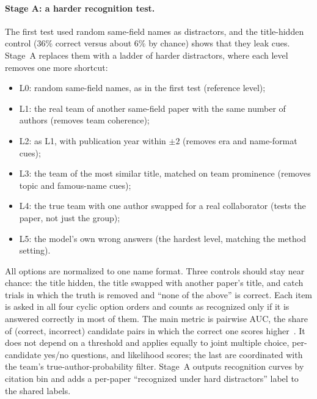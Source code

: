 \paragraph{Stage A: a harder recognition test.}
The first test used random same-field names as distractors, and the title-hidden control (36\% correct versus about 6\% by chance) shows that they leak cues. Stage~A replaces them with a ladder of harder distractors, where each level removes one more shortcut:
\begin{itemize}
\item L0: random same-field names, as in the first test (reference level);
\item L1: the real team of another same-field paper with the same number of authors (removes team coherence);
\item L2: as L1, with publication year within $\pm 2$ (removes era and name-format cues);
\item L3: the team of the most similar title, matched on team prominence (removes topic and famous-name cues);
\item L4: the true team with one author swapped for a real collaborator (tests the paper, not just the group);
\item L5: the model's own wrong answers (the hardest level, matching the method setting).
\end{itemize}
All options are normalized to one name format. Three controls should stay near chance: the title hidden, the title swapped with another paper's title, and catch trials in which the truth is removed and ``none of the above'' is correct. Each item is asked in all four cyclic option orders and counts as recognized only if it is answered correctly in most of them. The main metric is pairwise AUC, the share of (correct, incorrect) candidate pairs in which the correct one scores higher~\cite{gekhman2025insideout}. It does not depend on a threshold and applies equally to joint multiple choice, per-candidate yes/no questions, and likelihood scores; the last are coordinated with the team's true-author-probability filter. Stage~A outputs recognition curves by citation bin and adds a per-paper ``recognized under hard distractors'' label to the shared labels.

